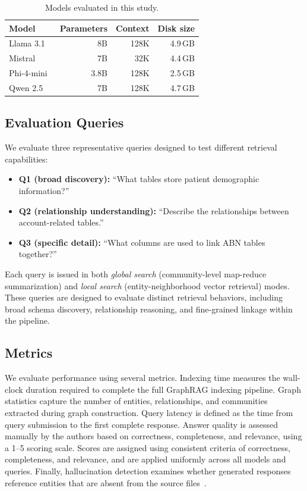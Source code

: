 \documentclass{article}
\begin{document}
\begin{table}[h]
  \caption{Models evaluated in this study.}
  \label{tab:models}
  \centering
  \begin{tabular}{lrrr}
    \toprule
    Model        & Parameters & Context & Disk size \\
    \midrule
    Llama 3.1~\cite{grattafiori2024llama}  & 8B         & 128K    & 4.9\,GB  \\
    Mistral~\cite{jiang20236g}   & 7B         & 32K     & 4.4\,GB  \\
    Phi-4-mini~\cite{abdin2024phi}& 3.8B       & 128K    & 2.5\,GB  \\
    Qwen 2.5~\cite{yang2025qwen3}  & 7B         & 128K    & 4.7\,GB  \\
    \bottomrule
  \end{tabular}
\end{table}

\subsection{Evaluation Queries}

We evaluate three representative queries designed to test different retrieval capabilities:
\begin{itemize}
  \item \textbf{Q1 (broad discovery):} ``What tables store patient demographic information?''
  \item \textbf{Q2 (relationship understanding):} ``Describe the relationships between
        account-related tables.''
  \item \textbf{Q3 (specific detail):} ``What columns are used to link ABN tables together?''
\end{itemize}
Each query is issued in both \emph{global search} (community-level map-reduce summarization) and \emph{local search} (entity-neighborhood vector retrieval) modes. These queries are designed to evaluate distinct retrieval behaviors, including broad schema discovery, relationship reasoning, and fine-grained linkage within the pipeline.

\subsection{Metrics}

We evaluate performance using several metrics. Indexing time measures the wall-clock duration required to complete the full GraphRAG indexing pipeline. Graph statistics capture the number of entities, relationships, and communities extracted during graph construction. Query latency is defined as the time from query submission to the first complete response. Answer quality is assessed manually by the authors based on correctness, completeness, and relevance, using a 1--5 scoring scale. Scores are assigned using consistent criteria of correctness, completeness, and relevance, and are applied uniformly across all models and queries. Finally, hallucination detection examines whether generated responses reference entities that are absent from the source files~\cite{ji2023survey}.
\end{document}
